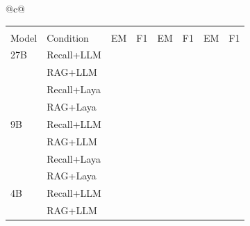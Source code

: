 \begin{tabular}{@{}c@{}}
\begin{tabular}{|>{\raggedright\arraybackslash}p{19pt}|>{\raggedright\arraybackslash}p{37pt}|>{\raggedleft\arraybackslash}p{\dimexpr(\columnwidth-56pt-16\tabcolsep-9\arrayrulewidth)/6\relax}|>{\raggedleft\arraybackslash}p{\dimexpr(\columnwidth-56pt-16\tabcolsep-9\arrayrulewidth)/6\relax}|>{\raggedleft\arraybackslash}p{\dimexpr(\columnwidth-56pt-16\tabcolsep-9\arrayrulewidth)/6\relax}|>{\raggedleft\arraybackslash}p{\dimexpr(\columnwidth-56pt-16\tabcolsep-9\arrayrulewidth)/6\relax}|>{\raggedleft\arraybackslash}p{\dimexpr(\columnwidth-56pt-16\tabcolsep-9\arrayrulewidth)/6\relax}|>{\raggedleft\arraybackslash}p{\dimexpr(\columnwidth-56pt-16\tabcolsep-9\arrayrulewidth)/6\relax}|}
\hline
\multicolumn{8}{|l|}{\emph{Panel A: EM / F1 (\%)}} \\
\hline
\multicolumn{2}{|c|}{} & \multicolumn{2}{c|}{HotpotQA} & \multicolumn{2}{c|}{2Wiki} & \multicolumn{2}{c|}{MuSiQue} \\
\cline{3-8}
Model & Condition & EM & F1 & EM & F1 & EM & F1 \\
\hline
27B & Recall+LLM & 30.0 & 39.9 & 32.0 & 38.5 & 10.0 & 17.0 \\ %
\cline{2-8}
 & RAG+LLM & 67.5 & 79.6 & 68.5 & 76.0 & 37.0 & 50.3 \\ %
\cline{2-8}
 & Recall+Laya & 28.0 & 38.9 & 33.5 & 39.4 & 10.0 & 18.2 \\ %
\cline{2-8}
 & RAG+Laya & 61.0 & 74.0 & 56.0 & 60.9 & 31.5 & 41.3 \\ %
\hline
9B & Recall+LLM & 21.0 & 30.4 & 26.0 & 30.0 & 4.0 & 10.5 \\ %
\cline{2-8}
 & RAG+LLM & 64.0 & 75.3 & 61.0 & 69.0 & 32.0 & 43.6 \\ %
\cline{2-8}
 & Recall+Laya & 21.0 & 30.0 & 26.0 & 29.5 & 4.0 & 11.4 \\ %
\cline{2-8}
 & RAG+Laya & 60.5 & 72.3 & 46.5 & 52.2 & 25.5 & 36.2 \\ %
\hline
4B & Recall+LLM & 21.0 & 29.7 & 24.5 & 28.5 & 3.5 & 8.8 \\ %
\cline{2-8}
 & RAG+LLM & 64.5 & 76.9 & 60.0 & 68.8 & 33.5 & 44.9 \\ %

\end{tabular}
\end{tabular}
